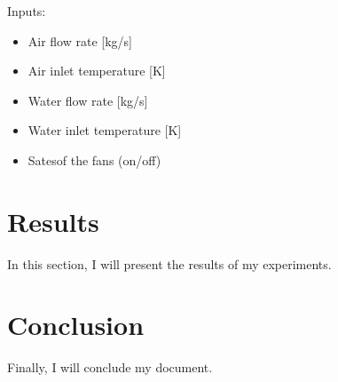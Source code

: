 \documentclass{article}
\begin{document}
Inputs:
\begin{itemize}
    \item Air flow rate [kg/s]
    \item Air inlet temperature [K]
    \item Water flow rate [kg/s]
    \item Water inlet temperature [K]
    \item Satesof the fans (on/off)
\end{itemize}

\section{Results}
In this section, I will present the results of my experiments.

\section{Conclusion}
Finally, I will conclude my document.
\end{document}
